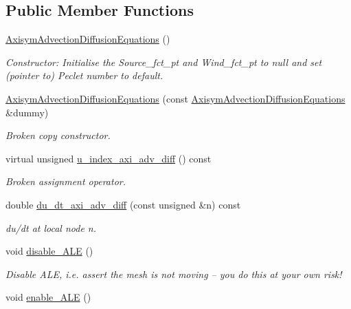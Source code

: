 \subsection*{Public Member Functions}
\begin{DoxyCompactItemize}
\item 
\hyperlink{classoomph_1_1AxisymAdvectionDiffusionEquations_ab095111fa0c06ea10810534711d3e25d}{Axisym\+Advection\+Diffusion\+Equations} ()
\begin{DoxyCompactList}\small\item\em Constructor\+: Initialise the Source\+\_\+fct\+\_\+pt and Wind\+\_\+fct\+\_\+pt to null and set (pointer to) Peclet number to default. \end{DoxyCompactList}\item 
\hyperlink{classoomph_1_1AxisymAdvectionDiffusionEquations_a6932ab2bbb743d14a97d26fd9f0000d4}{Axisym\+Advection\+Diffusion\+Equations} (const \hyperlink{classoomph_1_1AxisymAdvectionDiffusionEquations}{Axisym\+Advection\+Diffusion\+Equations} \&dummy)
\begin{DoxyCompactList}\small\item\em Broken copy constructor. \end{DoxyCompactList}\item 
virtual unsigned \hyperlink{classoomph_1_1AxisymAdvectionDiffusionEquations_a5638fd954bd0427e5470646c523fa3ac}{u\+\_\+index\+\_\+axi\+\_\+adv\+\_\+diff} () const
\begin{DoxyCompactList}\small\item\em Broken assignment operator. \end{DoxyCompactList}\item 
double \hyperlink{classoomph_1_1AxisymAdvectionDiffusionEquations_a5d89673630363ecbf7fe1e1b7f2d6c31}{du\+\_\+dt\+\_\+axi\+\_\+adv\+\_\+diff} (const unsigned \&n) const
\begin{DoxyCompactList}\small\item\em du/dt at local node n. \end{DoxyCompactList}\item 
void \hyperlink{classoomph_1_1AxisymAdvectionDiffusionEquations_a366b53e0b3af1fc245f2d5173503a241}{disable\+\_\+\+A\+LE} ()
\begin{DoxyCompactList}\small\item\em Disable A\+LE, i.\+e. assert the mesh is not moving -- you do this at your own risk! \end{DoxyCompactList}\item 
void \hyperlink{classoomph_1_1AxisymAdvectionDiffusionEquations_aed501802a434d3143650fe2215660bd5}{enable\+\_\+\+A\+LE} ()

\end{DoxyCompactItemize}
